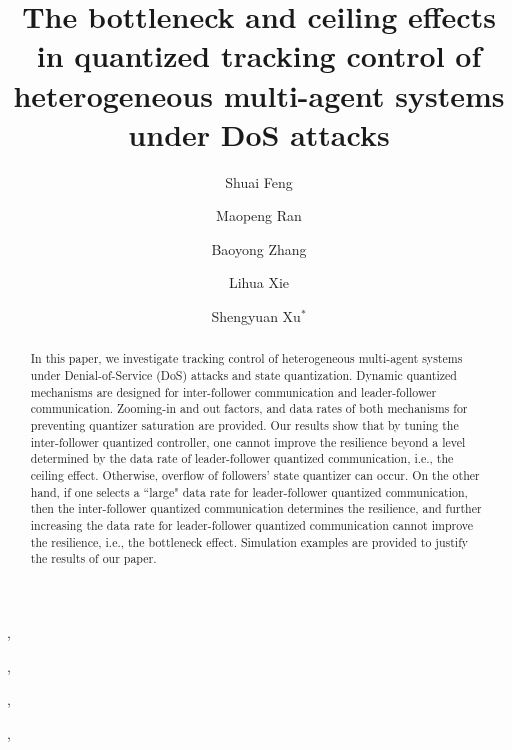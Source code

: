\documentclass{autart}
\begin{document}
	


	
	\begin{frontmatter}
		
		\title{The bottleneck and ceiling effects in quantized tracking control of heterogeneous multi-agent systems under DoS attacks  } %
				\vspace{-3mm}
		
		\vspace{-7mm}
		
		
		\author[First]{Shuai Feng},    %
		\author[Second]{Maopeng Ran},               %
			\author[First]{Baoyong Zhang},  
		\author[Third]{Lihua Xie},  %
		\author[First]{Shengyuan Xu$^*$}
						\vspace{-1mm}
		\address[First]{School of Automation, Nanjing University of Science and Technology, Nanjing 210094, China}  				\vspace{-1mm}                                             
		\address[Second]{School of Automation Science and Electrical Engineering, Beihang University, Beijing 100191, China and the Zhongguancun Laboratory, Beijing 100094, China}            
				\vspace{-1mm}
		\address[Third]{School of Electrical and Electronics Engineering, Nanyang Technological University, Singapore 68000, Singapore}      
		
	

		
\begin{abstract}                          %
In this paper, we investigate tracking control of heterogeneous multi-agent systems under Denial-of-Service (DoS) attacks and state quantization. Dynamic quantized mechanisms are designed for inter-follower communication and leader-follower communication. Zooming-in and out factors, and data rates of both mechanisms for preventing quantizer saturation are provided. Our results show that by tuning the inter-follower quantized controller, one cannot improve the resilience beyond a level determined by the data rate of leader-follower quantized communication, i.e., the ceiling effect. Otherwise, overflow of followers' state quantizer can occur. On the other hand, if one selects a ``large" data rate for leader-follower quantized communication, then the inter-follower quantized communication determines the resilience, and further increasing the data rate for leader-follower quantized communication cannot improve the resilience, i.e., the bottleneck effect. Simulation examples are provided to justify the results of our paper.
\vspace{-2mm}	
\end{abstract}
\vspace{-8mm}
\end{frontmatter}
\end{document}
